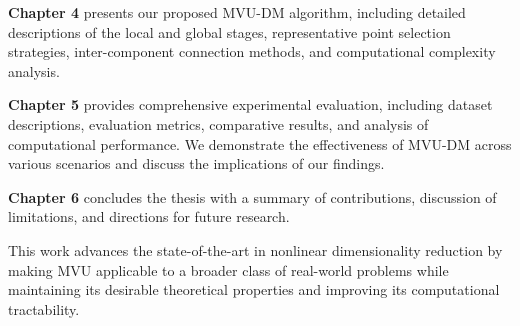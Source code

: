 \textbf{Chapter 4} presents our proposed \ac{MVU-DM} algorithm, including detailed descriptions of the local and global stages, representative point selection strategies, inter-component connection methods, and computational complexity analysis.

\textbf{Chapter 5} provides comprehensive experimental evaluation, including dataset descriptions, evaluation metrics, comparative results, and analysis of computational performance. We demonstrate the effectiveness of \ac{MVU-DM} across various scenarios and discuss the implications of our findings.

\textbf{Chapter 6} concludes the thesis with a summary of contributions, discussion of limitations, and directions for future research.

This work advances the state-of-the-art in nonlinear dimensionality reduction by making \ac{MVU} applicable to a broader class of real-world problems while maintaining its desirable theoretical properties and improving its computational tractability.